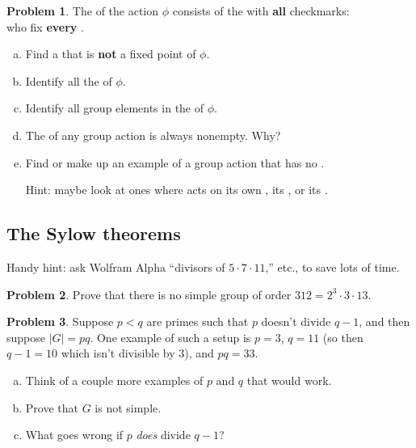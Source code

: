 \documentclass[12pt]{article}
\theoremstyle{definition} %
\newtheorem{problem}{Problem}
\begin{document}
\begin{problem}
  The  of the action $\phi$ consists of the  with \textbf{all} checkmarks: 
  \\ who fix \textbf{every} .

  \begin{enumerate}[(a)]
    \item Find a  that is \textbf{not} a fixed point of $\phi$.
    \item Identify all the  of $\phi$.
    \item Identify all group elements in the  of $\phi$.
    \item The  of any group action is always nonempty. Why?
    \item Find or make up an example of a group action that has no . 
    
    Hint: maybe look at ones where  acts on its own , its , or its .
  \end{enumerate}
\end{problem}

\subsection*{The Sylow theorems}

Handy hint: ask Wolfram Alpha ``divisors of $5\cdot 7 \cdot 11$,'' etc., to save lots of time.

\begin{problem}
  Prove that there is no simple group of order $312 = 2^3 \cdot 3 \cdot 13$.
\end{problem}

\begin{problem}\label{pq}
  Suppose $p<q$ are primes such that $p$ doesn't divide $q-1$, and then suppose $|G| = pq$. One example of such a setup is $p=3$, $q=11$ (so then $q-1 = 10$ which isn't divisible by $3$), and $pq = 33$.

  \begin{enumerate}[(a)]
    \item Think of a couple more examples of $p$ and $q$ that would work.
    \item Prove that $G$ is not simple.
    \item What goes wrong if $p$ \textit{does} divide $q-1$?
  \end{enumerate}
\end{problem}
\end{document}
